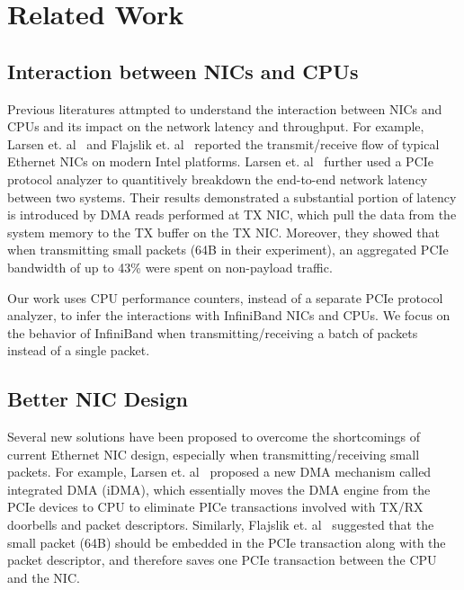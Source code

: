 \section{Related Work}
\label{sec:related}

\subsection{Interaction between NICs and CPUs}

Previous literatures attmpted to understand the interaction between
NICs and CPUs and its impact on the network latency and
throughput. For example, Larsen et. al~\cite{larsen:2011,larsen:2014}
and Flajslik et. al~\cite{Flajslik:usenix2013} reported the transmit/receive
flow of typical Ethernet NICs on modern Intel platforms. Larsen
et. al~\cite{larsen:2011,larsen:2014} further used a PCIe protocol
analyzer to quantitively breakdown the end-to-end network latency
between two systems. Their results demonstrated a substantial portion
of latency is introduced by DMA reads performed at TX NIC, which pull
the data from the system memory to the TX buffer on the TX
NIC. Moreover, they showed that when transmitting small packets (64B
in their experiment), an aggregated PCIe bandwidth of up to 43\% were
spent on non-payload traffic. 

Our work uses CPU performance counters, instead of a separate PCIe
protocol analyzer, to infer the interactions with InfiniBand NICs and
CPUs. We focus on the behavior of InfiniBand when
transmitting/receiving a batch of packets instead of a single packet.

\subsection{Better NIC Design}

Several new solutions have been proposed to overcome the shortcomings
of current Ethernet NIC design, especially when transmitting/receiving
small packets. For example, Larsen
et. al~\cite{larsen:2011,larsen:2014} proposed a new DMA mechanism
called integrated DMA (iDMA), which essentially moves the DMA engine
from the PCIe devices to CPU to eliminate PICe transactions involved
with TX/RX doorbells and packet descriptors. Similarly, Flajslik
et. al~\cite{Flajslik:usenix2013} suggested that the small packet (64B)
should be embedded in the PCIe transaction along with the packet
descriptor, and therefore saves one PCIe transaction between the CPU
and the NIC.
